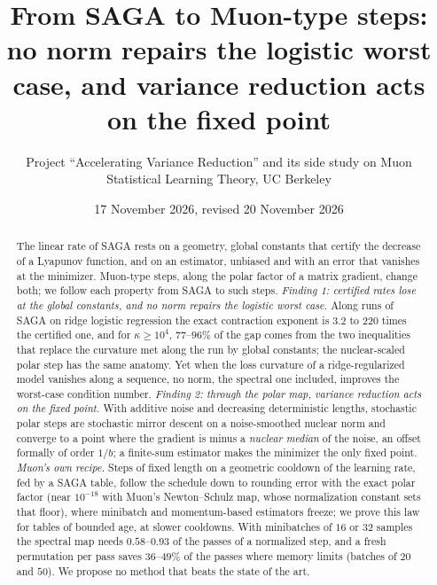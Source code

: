 \documentclass[10pt]{article}
\title{\vspace{-2.2em}From SAGA to Muon-type steps:\\ no norm repairs the logistic worst case, and variance reduction
acts on the fixed point}
\author{Project ``Accelerating Variance Reduction'' and its side study on Muon\\ Statistical Learning Theory, UC Berkeley}
\date{\vspace{-0.4em}17 November 2026, revised 20 November 2026}
\makeatletter
\renewcommand\section{\@startsection{section}{1}{\z@}{-2.4ex \@plus -0.6ex \@minus -.2ex}{1.2ex \@plus .2ex}{\normalfont\large\bfseries}}
\theoremstyle{remark}
\makeatother
\begin{document}
\maketitle

\begin{abstract}
The linear rate of SAGA rests on a geometry, global constants that certify the decrease of a Lyapunov function, and on
an estimator, unbiased and with an error that vanishes at the minimizer. Muon-type steps, along the polar factor of a
matrix gradient, change both; we follow each property from SAGA to such steps. \emph{Finding 1: certified rates lose at
the global constants, and no norm repairs the logistic worst case.} Along runs of SAGA on ridge logistic regression the
exact contraction exponent is $3.2$ to $220$ times the certified one, and for $\kappa\ge10^4$, $77$--$96\%$ of the gap
comes from the two inequalities that replace the curvature met along the run by global constants; the nuclear-scaled
polar step has the same anatomy. Yet when the loss curvature of a ridge-regularized model vanishes along a sequence, no
norm, the spectral one included, improves the worst-case condition number. \emph{Finding 2: through the polar map,
variance reduction acts on the fixed point.} With additive noise and decreasing deterministic lengths, stochastic polar
steps are stochastic mirror descent on a noise-smoothed nuclear norm and converge to a point where the gradient is minus
a \emph{nuclear median} of the noise, an offset formally of order $1/b$; a finite-sum estimator makes the minimizer the
only fixed point. \emph{Muon's own recipe.} Steps of fixed length on a geometric cooldown of the learning rate, fed by a
SAGA table, follow the schedule down to rounding error with the exact polar factor (near $10^{-18}$ with Muon's
Newton--Schulz map, whose normalization constant sets that floor), where minibatch and momentum-based estimators freeze;
we prove this law for tables of bounded age, at slower cooldowns. With minibatches of $16$ or $32$ samples the spectral
map needs $0.58$--$0.93$ of the passes of a normalized step, and a fresh permutation per pass saves $36$--$49\%$ of the
passes where memory limits (batches of $20$ and $50$). We propose no method that beats the state of the art.
\end{abstract}

\section{Introduction}\label{sec:intro}
\end{document}
